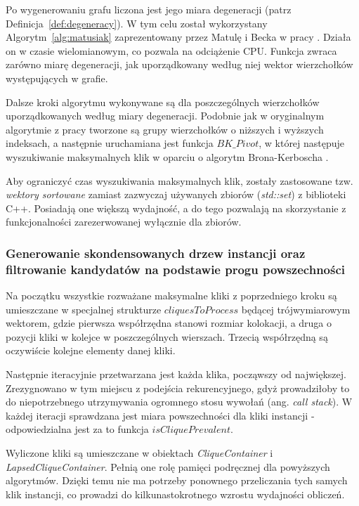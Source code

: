 \documentclass[12pt]{article}
\newcounter{algorytm}
\begin{document}
Po wygenerowaniu grafu liczona jest jego miara degeneracji (patrz Definicja~\ref{def:degeneracy}). W tym celu został wykorzystany Algorytm~\ref{alg:matusiak} zaprezentowany przez Matulę i Becka w pracy \cite{matusiak}. Działa on w czasie wielomianowym, co pozwala na odciążenie CPU. Funkcja zwraca zarówno miarę degeneracji, jak uporządkowany według niej wektor wierzchołków występujących w grafie.

Dalsze kroki algorytmu wykonywane są dla poszczególnych wierzchołków uporządkowanych według miary degeneracji. Podobnie jak w oryginalnym algorytmie z pracy \cite{pivot} tworzone są grupy wierzchołków o niższych i wyższych indeksach, a następnie uruchamiana jest funkcja $ BK\_Pivot $, w której następuje wyszukiwanie maksymalnych klik w oparciu o algorytm Brona-Kerboscha \cite{kerbosz}. 

Aby ograniczyć czas wyszukiwania maksymalnych klik, zostały zastosowane tzw. \textit{wektory sortowane} zamiast zazwyczaj używanych zbiorów (\textit{std::set}) z biblioteki C++. Posiadają one większą wydajność, a do tego pozwalają na skorzystanie z funkcjonalności zarezerwowanej wyłącznie dla zbiorów.

\subsubsection{Generowanie skondensowanych drzew instancji oraz filtrowanie kandydatów na podstawie progu powszechności}

Na początku wszystkie rozważane maksymalne kliki z poprzedniego kroku są umieszczane w specjalnej strukturze $ cliquesToProcess $ będącej trójwymiarowym wektorem, gdzie pierwsza współrzędna stanowi rozmiar kolokacji, a druga o pozycji kliki w kolejce w poszczególnych wierszach. Trzecią współrzędną są oczywiście kolejne elementy danej kliki.

Następnie iteracyjnie przetwarzana jest każda klika, począwszy od największej. Zrezygnowano w tym miejscu z podejścia rekurencyjnego, gdyż prowadziłoby to do niepotrzebnego utrzymywania ogromnego stosu wywołań (ang. \textit{call stack}). W każdej iteracji sprawdzana jest miara powszechności dla kliki instancji - odpowiedzialna jest za to funkcja $ isCliquePrevalent $. 

Wyliczone kliki są umieszczane w obiektach \textit{CliqueContainer} i \textit{LapsedCliqueContainer}. Pełnią one rolę pamięci podręcznej dla powyższych algorytmów. Dzięki temu nie ma potrzeby ponownego przeliczania tych samych klik instancji, co prowadzi do kilkunastokrotnego wzrostu wydajności obliczeń.
\end{document}
